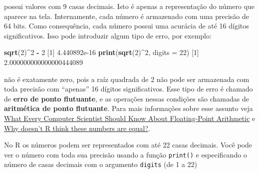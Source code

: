 \documentclass[10pt,a4paper]{book}
\newenvironment{Shaded}{\begin{snugshade}}{\end{snugshade}}
\newcommand{\KeywordTok}[1]{\textcolor[rgb]{0.13,0.29,0.53}{\textbf{#1}}}
\newcommand{\DataTypeTok}[1]{\textcolor[rgb]{0.13,0.29,0.53}{#1}}
\newcommand{\DecValTok}[1]{\textcolor[rgb]{0.00,0.00,0.81}{#1}}
\newcommand{\FloatTok}[1]{\textcolor[rgb]{0.00,0.00,0.81}{#1}}
\newcommand{\StringTok}[1]{\textcolor[rgb]{0.31,0.60,0.02}{#1}}
\newcommand{\OperatorTok}[1]{\textcolor[rgb]{0.81,0.36,0.00}{\textbf{#1}}}
\newcommand{\NormalTok}[1]{#1}
\begin{document}
possui valores com 9 casas decimais. Isto é apenas a representação do
número que aparece na tela. Internamente, cada número é armazenado com
uma precisão de 64 bits. Como consequência, cada número possui uma
acurácia de até 16 dígitos significativos. Isso pode introduzir algum
tipo de erro, por exemplo:

\begin{Shaded}
\begin{Highlighting}[]
\KeywordTok{sqrt}\NormalTok{(}\DecValTok{2}\NormalTok{)}\OperatorTok{^}\DecValTok{2} \OperatorTok{-}\StringTok{ }\DecValTok{2}
\NormalTok{[}\DecValTok{1}\NormalTok{] }\FloatTok{4.440892e-16}
\KeywordTok{print}\NormalTok{(}\KeywordTok{sqrt}\NormalTok{(}\DecValTok{2}\NormalTok{)}\OperatorTok{^}\DecValTok{2}\NormalTok{, }\DataTypeTok{digits =} \DecValTok{22}\NormalTok{)}
\NormalTok{[}\DecValTok{1}\NormalTok{] }\FloatTok{2.000000000000000444089}
\end{Highlighting}
\end{Shaded}

não é exatamente zero, pois a raíz quadrada de 2 não pode ser armazenada
com toda precisão com ``apenas'' 16 dígitos significativos. Esse tipo de
erro é chamado de \textbf{erro de ponto flutuante}, e as operações
nessas condições são chamadas de \textbf{aritmética de ponto flutuante}.
Para mais informações sobre esse assunto veja
\href{http://www.validlab.com/goldberg/paper.pdf}{What Every Computer
Scientist Should Know About Floating-Point Arithmetic} e
\href{http://cran-r.c3sl.ufpr.br/doc/FAQ/R-FAQ.html\#Why-doesn_0027t-R-think-these-numbers-are-equal_003f}{Why
doesn't R think these numbers are equal?}.

No R os números podem ser representados com até 22 casas decimais. Você
pode ver o número com toda sua precisão usando a função \texttt{print()}
e especificando o número de casas decimais com o argumento
\texttt{digits} (de 1 a 22)
\end{document}
